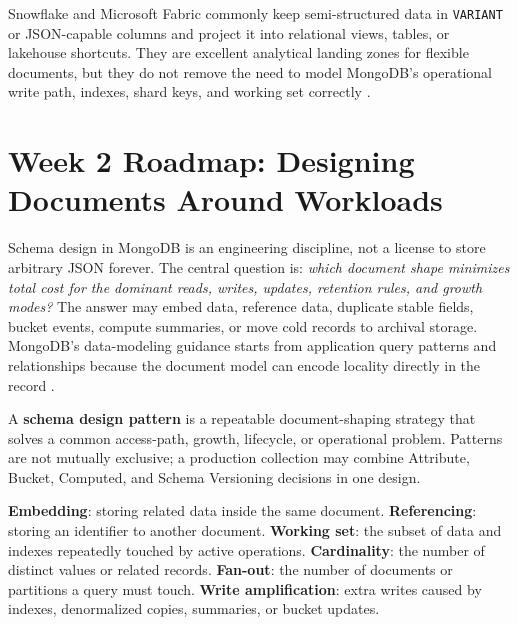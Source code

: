 \begin{crosscloud}
\vspace{1mm}
Snowflake and Microsoft Fabric commonly keep semi-structured data in \texttt{VARIANT} or JSON-capable columns and project it into relational views, tables, or lakehouse shortcuts. They are excellent analytical landing zones for flexible documents, but they do not remove the need to model MongoDB's operational write path, indexes, shard keys, and working set correctly \cite{mongodbDataModelingDocs,dynamodbSingleTableDocs,cosmosPartitionDocs,firestoreDataModelDocs,snowflakeSemiStructuredDocs,fabricJsonDocs}.
\end{crosscloud}

\section{Week 2 Roadmap: Designing Documents Around Workloads}
Schema design in MongoDB is an engineering discipline, not a license to store arbitrary JSON forever. The central question is: \emph{which document shape minimizes total cost for the dominant reads, writes, updates, retention rules, and growth modes?} The answer may embed data, reference data, duplicate stable fields, bucket events, compute summaries, or move cold records to archival storage. MongoDB's data-modeling guidance starts from application query patterns and relationships because the document model can encode locality directly in the record \cite{mongodbDataModelingDocs,mongodbSchemaPatternsDocs}.

\begin{definitionbox}
A \textbf{schema design pattern} is a repeatable document-shaping strategy that solves a common access-path, growth, lifecycle, or operational problem. Patterns are not mutually exclusive; a production collection may combine Attribute, Bucket, Computed, and Schema Versioning decisions in one design.
\end{definitionbox}

\begin{keyterms}
\textbf{Embedding}: storing related data inside the same document. \textbf{Referencing}: storing an identifier to another document. \textbf{Working set}: the subset of data and indexes repeatedly touched by active operations. \textbf{Cardinality}: the number of distinct values or related records. \textbf{Fan-out}: the number of documents or partitions a query must touch. \textbf{Write amplification}: extra writes caused by indexes, denormalized copies, summaries, or bucket updates.
\end{keyterms}

